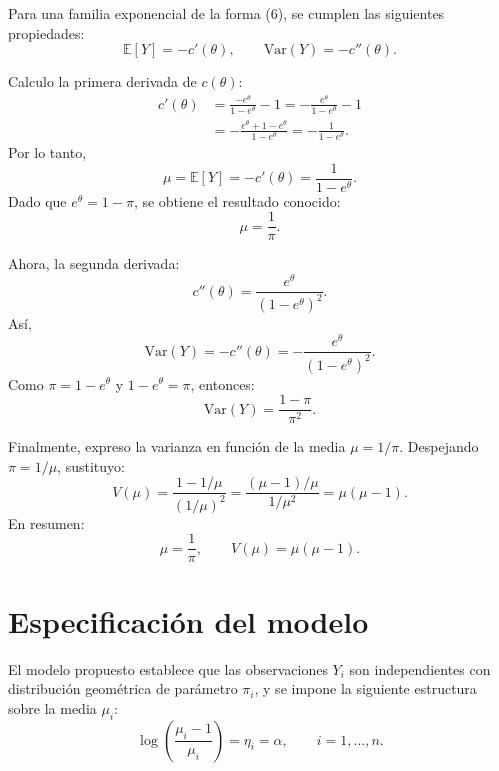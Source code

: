 \documentclass{article}
\begin{document}
Para una familia exponencial de la forma (6), se cumplen las siguientes propiedades:
\begin{equation}
\mathbb{E}[Y] = -c'(\theta), \qquad \text{Var}(Y) = -c''(\theta).
\end{equation}

Calculo la primera derivada de $c(\theta)$:
\begin{align}
c'(\theta) &= \frac{-e^\theta}{1-e^\theta} - 1 = -\frac{e^\theta}{1-e^\theta} - 1 \\
           &= -\frac{e^\theta + 1 - e^\theta}{1-e^\theta} = -\frac{1}{1-e^\theta}.
\end{align}
Por lo tanto,
\begin{equation}
\mu = \mathbb{E}[Y] = -c'(\theta) = \frac{1}{1-e^\theta}.
\end{equation}
Dado que $e^\theta = 1-\pi$, se obtiene el resultado conocido:
\begin{equation}
\mu = \frac{1}{\pi}.
\end{equation}

Ahora, la segunda derivada:
\begin{equation}
c''(\theta) = \frac{e^\theta}{(1-e^\theta)^2}.
\end{equation}
Así,
\begin{equation}
\text{Var}(Y) = -c''(\theta) = -\frac{e^\theta}{(1-e^\theta)^2}.
\end{equation}
Como $\pi = 1 - e^\theta$ y $1-e^\theta = \pi$, entonces:
\begin{equation}
\text{Var}(Y) = \frac{1-\pi}{\pi^2}.
\end{equation}

Finalmente, expreso la varianza en función de la media $\mu = 1/\pi$. Despejando $\pi = 1/\mu$, sustituyo:
\begin{equation}
V(\mu) = \frac{1 - 1/\mu}{(1/\mu)^2} = \frac{(\mu-1)/\mu}{1/\mu^2} = \mu(\mu-1).
\end{equation}
En resumen:
\begin{equation}
\boxed{\mu = \frac{1}{\pi}}, \qquad \boxed{V(\mu) = \mu(\mu-1)}.
\end{equation}

\section{Especificación del modelo}

El modelo propuesto establece que las observaciones $Y_i$ son independientes con distribución geométrica de parámetro $\pi_i$, y se impone la siguiente estructura sobre la media $\mu_i$:
\begin{equation}
\log\left(\frac{\mu_i - 1}{\mu_i}\right) = \eta_i = \alpha, \qquad i = 1,\ldots,n.
\end{equation}
\end{document}
